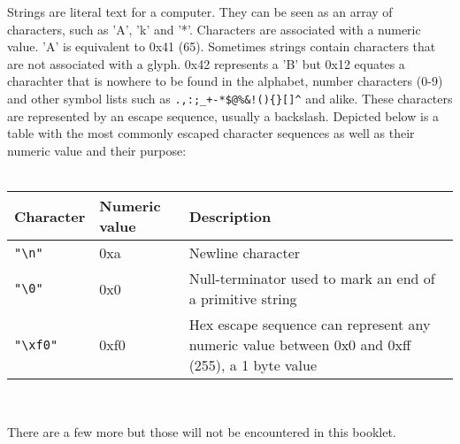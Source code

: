 Strings are literal text for a computer. They can be seen as an array of characters, such as 'A', 'k' and '*'. Characters are
associated with a numeric value. 'A' is equivalent to 0x41 (65). Sometimes strings contain characters that are not associated
with a glyph. 0x42 represents a 'B' but 0x12 equates a charachter that is nowhere to be found in the alphabet, number characters
(0-9) and other symbol lists such as \texttt{.,:;\_+-*\$@\%\&!()\{\}[]\^} and alike. These characters are represented
by an escape sequence, usually a backslash. Depicted below is a table with the most commonly escaped character sequences as well as their numeric value and their purpose: \\ \\

\begin{centering}
\begin{tabular}{ | m{2cm} | m{1.5cm} | m{7.5cm} |}

Character & Numeric value & Description \\
  \hline
 \texttt{"\textbackslash n"} & 0xa & Newline character \\
 \texttt{"\textbackslash 0"} & 0x0 & Null-terminator used to mark an end of a primitive string \\
 \texttt{"\textbackslash xf0"} &  0xf0 & Hex escape sequence can represent any numeric value between 0x0 and 0xff (255), a 1 byte value \\
\end{tabular} 
\end{centering}
\\
\bigskip
\newline
\raggedright
There are a few more but those will not be encountered in this booklet.
